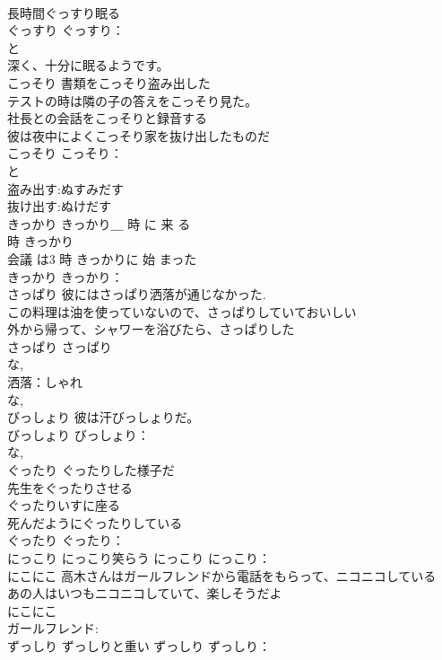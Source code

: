 \documentclass[8pt]{extreport}
\begin{document}
\begin{CJK}{UTF8}{min}
\\	長時間ぐっすり眠る 
\\	ぐっすり			ぐっすり：
\\	と 
\\	深く、十分に眠るようです。
\\	こっそり	書類をこっそり盗み出した 
\\	テストの時は隣の子の答えをこっそり見た。 
\\	社長との会話をこっそりと録音する 
\\	彼は夜中によくこっそり家を抜け出したものだ 
\\	こっそり			こっそり：
\\	と 
\\	盗み出す:ぬすみだす
\\	抜け出す:ぬけだす
\\	きっかり	きっかり＿ 時 に 来 る 
\\	時 きっかり 
\\	会議 は3 時 きっかりに 始 まった 
\\	きっかり			きっかり：
\\	さっぱり	彼にはさっぱり洒落が通じなかった. 
\\	この料理は油を使っていないので、さっぱりしていておいしい 
\\	外から帰って、シャワーを浴びたら、さっぱりした 
\\	さっぱり			さっぱり
\\	な, 
\\	洒落：しゃれ
\\	な, 
\\	びっしょり	彼は汗びっしょりだ。 
\\	びっしょり			びっしょり：
\\	な, 
\\	ぐったり	ぐったりした様子だ 
\\	先生をぐったりさせる 
\\	ぐったりいすに座る 
\\	死んだようにぐったりしている 
\\	ぐったり			ぐったり：
\\	にっこり	にっこり笑らう	にっこり			にっこり：
\\	にこにこ	高木さんはガールフレンドから電話をもらって、ニコニコしている 
\\	あの人はいつもニコニコしていて、楽しそうだよ 
\\	にこにこ			
\\	ガールフレンド:
\\	ずっしり	ずっしりと重い	ずっしり			ずっしり：

\end{CJK}
\end{document}
